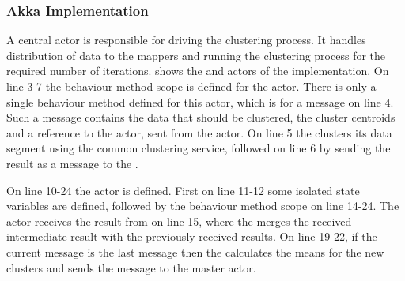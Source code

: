 \subsubsection{Akka Implementation}
A central  actor is responsible for driving the clustering process. It handles distribution of data to the mappers and running the clustering process for the required number of iterations.  shows the  and  actors of the implementation. On line 3-7 the behaviour method scope is defined for the  actor. There is only a single behaviour method defined for this actor, which is for a  message on line 4. Such a message contains the data that should be clustered, the cluster centroids and a reference to the  actor, sent from the  actor. On line 5 the  clusters its data segment using the common clustering service, followed on line 6 by sending the result as a  message to the .

On line 10-24 the  actor is defined. First on line 11-12 some isolated state variables are defined, followed by the behaviour method scope on line 14-24.
The  actor receives the result from  on line 15, where the  merges the received intermediate result with the previously received results. On line 19-22, if the current message is the last message then the  calculates the means for the new clusters and sends the  message to the master actor.

